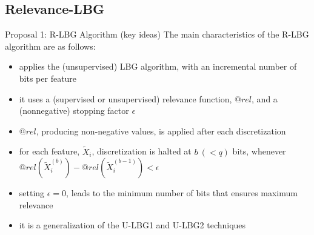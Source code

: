 \documentclass{beamer}
\begin{document}
\subsection[Relevance-LBG]{Relevance-LBG}
\begin{frame}{Proposal 1: R-LBG Algorithm (key ideas)}
The main characteristics of the R-LBG algorithm are as follows:
\begin{itemize}
  \vfill
	\item applies the (unsupervised) LBG algorithm, with an 
	incremental number of bits per feature

  \vfill
	\item it uses a (supervised or unsupervised) relevance function, $@rel$, 
	and a (nonnegative) stopping factor $\epsilon$
	
	\vfill
	\item $@rel$, producing non-negative values, is applied after each discretization
	
	\vfill
	\item for each feature, $\widetilde{X}_i$, discretization is halted at $b \ (< q)$ bits, whenever
	$@rel(\widetilde{X}_i^{(b)}) - @rel(\widetilde{X}_i^{(b-1)}) < \epsilon$
	
	\vfill
	\item setting $\epsilon=0$, leads to the minimum number of bits 
	that ensures maximum relevance	
	
	\vfill
	\item it is a generalization of the U-LBG1 and U-LBG2 techniques
	
\end{itemize}
\end{frame}
\end{document}
